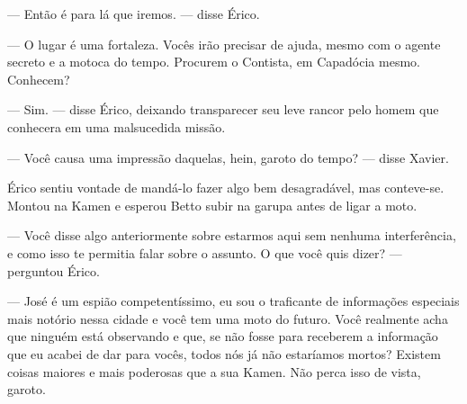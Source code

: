 --- Então é para lá que iremos. --- disse Érico.

--- O lugar é uma fortaleza. Vocês irão precisar de ajuda, mesmo com o agente secreto e a motoca do tempo. Procurem o Contista, em Capadócia mesmo. Conhecem?

--- Sim. --- disse Érico, deixando transparecer seu leve rancor pelo homem que conhecera em uma malsucedida missão.

--- Você causa uma impressão daquelas, hein, garoto do tempo? --- disse Xavier.

Érico sentiu vontade de mandá-lo fazer algo bem desagradável, mas conteve-se. Montou na Kamen e esperou Betto subir na garupa antes de ligar a moto.

--- Você disse algo anteriormente sobre estarmos aqui sem nenhuma interferência, e como isso te permitia falar sobre o assunto. O que você quis dizer? --- perguntou Érico.

--- José é um espião competentíssimo, eu sou o traficante de informações especiais mais notório nessa cidade e você tem uma moto do futuro. Você realmente acha que ninguém está observando e que, se não fosse para receberem a informação que eu acabei de dar para vocês, todos nós já não estaríamos mortos? Existem coisas maiores e mais poderosas que a sua Kamen. Não perca isso de vista, garoto.


